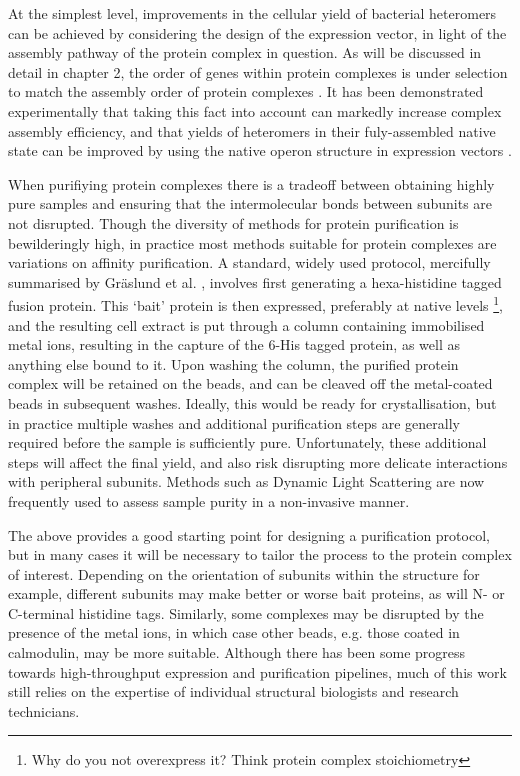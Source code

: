 \documentclass[a4paper,11pt,twoside,openright]{scrbook}
\let\cite\supercite
\begin{document}
At the simplest level, improvements in the cellular yield of bacterial heteromers can be achieved by considering the design of the expression vector, in light of the assembly pathway of the protein complex in question. As will be discussed in detail in chapter 2, the order of genes within protein complexes is under selection to match the assembly order of protein complexes \cite{Wells2016}. It has been demonstrated experimentally that taking this fact into account can markedly increase complex assembly efficiency, and that yields of heteromers in their fuly-assembled native state can be improved by using the native operon structure in expression vectors \cite{Shieh2015a, Poulsen2010}.

When purifiying protein complexes there is a tradeoff between obtaining highly pure samples and ensuring that the intermolecular bonds between subunits are not disrupted. Though the diversity of methods for protein purification is bewilderingly high, in practice most methods suitable for protein complexes are variations on affinity purification. A standard, widely used protocol, mercifully summarised by Gr{\"a}slund et al. \cite{Graslund2008}, involves first generating a hexa-histidine tagged fusion protein. This `bait' protein is then expressed, preferably at native levels \footnote{Why do you not overexpress it? Think protein complex stoichiometry}, and the resulting cell extract is put through a column containing immobilised metal ions, resulting in the capture of the 6-His tagged protein, as well as anything else bound to it. Upon washing the column, the purified protein complex will be retained on the beads, and can be cleaved off the metal-coated beads in subsequent washes. Ideally, this would be ready for crystallisation, but in practice multiple washes and additional purification steps are generally required before the sample is sufficiently pure. Unfortunately, these additional steps will affect the final yield, and also risk disrupting more delicate interactions with peripheral subunits. Methods such as Dynamic Light Scattering are now frequently used to assess sample purity in a non-invasive manner.

The above provides a good starting point for designing a purification protocol, but in many cases it will be necessary to tailor the process to the protein complex of interest. Depending on the orientation of subunits within the structure for example, different subunits may make better or worse bait proteins, as will N- or C-terminal histidine tags. Similarly, some complexes may be disrupted by the presence of the metal ions, in which case other beads, e.g. those coated in calmodulin, may be more suitable. Although there has been some progress towards high-throughput expression and purification pipelines, much of this work still relies on the expertise of individual structural biologists and research technicians.
\end{document}
